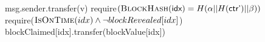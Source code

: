 \begin{figure}
\begin{algorithm}[H]
\begin{algorithmic}[1]
             \State\textsf{msg.sender.transfer}(v)
          \EndFunction
             \State \textsf{require}$(\textsc{BlockHash}(\textsf{idx}) = H(\alpha || H(\textsf{ctr'}) || \beta))$
             \State \textsf{require}($\textsc{IsOnTime}(idx) \land \lnot blockRevealed[idx]$)
             \State \textsf{blockClaimed}[\textsf{idx}].\textsf{transfer}(\textsf{blockValue}[\textsf{idx}])
          \EndFunction
        \EndContract
    \vskip2pt
    \end{algorithmic}
\end{algorithm}
\end{figure}
